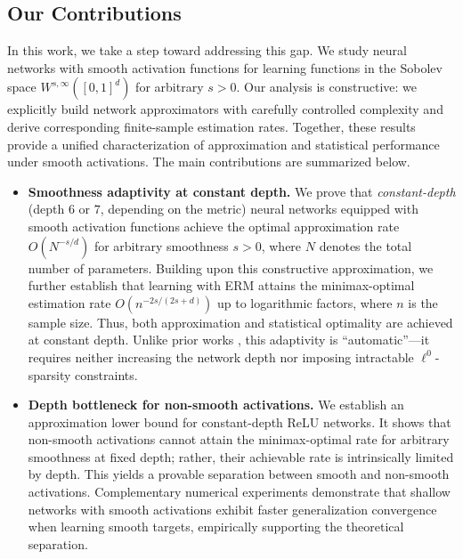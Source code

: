\documentclass[11pt]{article}
\begin{document}
\subsection{Our Contributions}

In this work, we take a step toward addressing this gap. We study neural networks with smooth activation functions for learning  functions in the Sobolev space  $W^{s,\infty}([0,1]^d)$ for arbitrary  $s>0$. Our analysis is constructive: we explicitly build  network approximators with carefully controlled complexity and derive corresponding finite-sample estimation rates. Together, these results provide a unified characterization of approximation and statistical performance under smooth activations. The main contributions are summarized below.

\begin{itemize}
    \item \textbf{Smoothness adaptivity at constant depth.}
We prove that {\it constant-depth} (depth $6$ or $7$, depending on the metric) 
neural networks equipped with smooth activation functions 
achieve the optimal approximation rate
$
    O(N^{-s/d})
$
for arbitrary smoothness $s>0$, where $N$ denotes the total number of parameters.
Building upon this constructive approximation, we further establish that learning with ERM attains the minimax-optimal estimation rate
$
    O(n^{-2s/(2s+d)})
$
up to logarithmic factors, where $n$ is the sample size. Thus, both approximation and statistical optimality  are achieved at constant depth.
Unlike prior works \citep{bauer2019deep, schmidt2020nonparametric, suzukiadaptivity, ohn2019smooth}, this adaptivity is ``automatic''---it requires neither increasing the network depth  nor imposing intractable $\ell^0$-sparsity constraints. 
  

    \item \textbf{Depth bottleneck for non-smooth activations.}
We establish an approximation lower bound for constant-depth ReLU networks. It shows that non-smooth activations 
cannot attain the minimax-optimal rate for arbitrary smoothness at fixed depth; rather, their achievable rate is intrinsically limited by depth. 
This yields a provable separation between smooth and non-smooth activations. Complementary numerical experiments  demonstrate that shallow networks with smooth activations exhibit faster generalization convergence when learning smooth targets, empirically supporting the theoretical separation.
\end{itemize}
\end{document}
